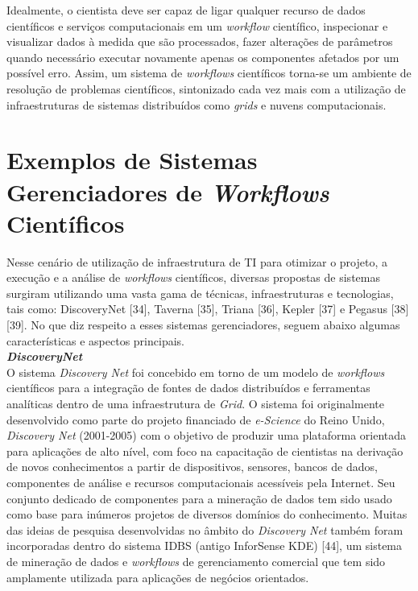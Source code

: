 Idealmente, o cientista deve ser capaz de ligar qualquer recurso de dados científicos e serviços computacionais em um \textit{workflow} científico, inspecionar e visualizar dados à medida que são processados, fazer alterações de parâmetros quando necessário executar novamente apenas os componentes afetados por um possível erro. Assim, um sistema de \textit{workflows} científicos torna-se um ambiente de resolução de problemas científicos, sintonizado cada vez mais com a utilização de infraestruturas de sistemas distribuídos como \textit{grids} e nuvens computacionais.

\section{Exemplos de Sistemas Gerenciadores de \textit{Workflows} Científicos} \label{cap3sec4}

Nesse cenário de utilização de infraestrutura de TI para otimizar o projeto, a execução e a análise de \textit{workflows} científicos, diversas propostas de sistemas surgiram utilizando uma vasta gama de técnicas, infraestruturas e tecnologias, tais como: DiscoveryNet [34], Taverna [35], Triana [36], Kepler [37] e Pegasus [38][39]. No que diz respeito a esses sistemas gerenciadores, seguem abaixo algumas características e aspectos principais. \\


\noindent
\textbf{\textit{DiscoveryNet}} \\

\noindent
O sistema \textit{Discovery Net} foi concebido em torno de um modelo de \textit{workflows} científicos para a integração de fontes de dados distribuídos e ferramentas analíticas dentro de uma infraestrutura de \textit{Grid}. O sistema foi originalmente desenvolvido como parte do projeto financiado de \textit{e-Science} do Reino Unido, \textit{Discovery Net} (2001-2005) com o objetivo de produzir uma plataforma orientada para aplicações de alto nível, com foco na capacitação de cientistas na derivação de novos conhecimentos a partir de dispositivos, sensores, bancos de dados, componentes de análise e recursos computacionais acessíveis pela Internet. Seu conjunto dedicado de componentes para a mineração de dados tem sido usado como base para inúmeros projetos de diversos domínios do conhecimento. Muitas das ideias de pesquisa desenvolvidas no âmbito do \textit{Discovery Net} também foram incorporadas dentro do sistema IDBS (antigo InforSense KDE) [44], um sistema de mineração de dados e \textit{workflows} de gerenciamento comercial que tem sido amplamente utilizada para aplicações de negócios orientados. 
    
